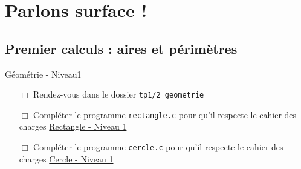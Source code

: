 \section{Parlons surface !}
\subsection{Premier calculs : aires et périmètres}

\begin{UPSTIManipulation}{Géométrie - Niveau1}
	\begin{itemize}
		\item[$\Box$] Rendez-vous dans le dossier \texttt{tp1/2\_geometrie}
		\item[$\Box$] Compléter le programme \texttt{rectangle.c} pour qu'il respecte le cahier des charges \href{\#aire-dun-rectangle}{Rectangle - Niveau 1}
		\item[$\Box$] Compléter le programme \texttt{cercle.c} pour qu'il respecte le cahier des charges \href{\#aire-et-périmètre-dun-cercle}{Cercle - Niveau 1}
	\end{itemize}
\end{UPSTIManipulation}

